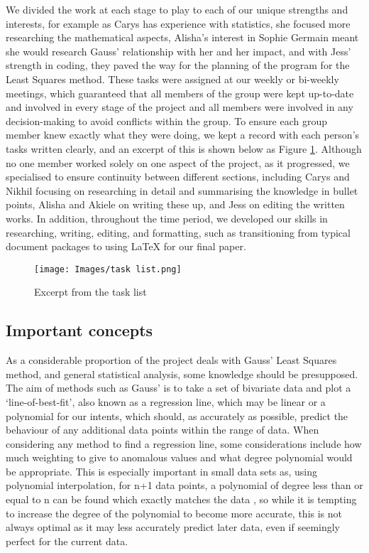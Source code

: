 \documentclass{article}
\begin{document}
We divided the work at each stage to play to each of our unique strengths and interests, for example as Carys has experience with statistics, she focused more researching the mathematical aspects, Alisha’s interest in Sophie Germain meant she would research Gauss' relationship with her and her impact, and with Jess’ strength in coding, they paved the way for the planning of the program for the Least Squares method. These tasks were assigned at our weekly or bi-weekly meetings, which guaranteed that all members of the group were kept up-to-date and involved in every stage of the project and all members were involved in any decision-making to avoid conflicts within the group. To ensure each group member knew exactly what they were doing, we kept a record with each person's tasks written clearly, and an excerpt of this is shown below as Figure \ref{tasklist}. Although no one member worked solely on one aspect of the project, as it progressed, we specialised to ensure continuity between different sections, including Carys and Nikhil focusing on researching in detail and summarising the knowledge in bullet points, Alisha and Akiele on writing these up, and Jess on editing the written works. In addition, throughout the time period, we developed our skills in researching, writing, editing, and formatting, such as transitioning from typical document packages to using LaTeX for our final paper.
\begin{figure}[H]
\centering
    \texttt{[image: Images/task list.png]} 
    \caption{Excerpt from the task list }
    \label{tasklist}
\end{figure}

\subsection{Important concepts}

As a considerable proportion of the project deals with Gauss’ Least Squares method, and general statistical analysis, some knowledge should be presupposed. The aim of methods such as Gauss’ is to take a set of bivariate data and plot a ‘line-of-best-fit', also known as a regression line, which may be linear or a polynomial for our intents, which should, as accurately as possible, predict the behaviour of any additional data points within the range of data. When considering any method to find a regression line, some considerations include how much weighting to give to anomalous values and what degree polynomial would be appropriate. This is especially important in small data sets as, using polynomial interpolation, for n+1 data points, a polynomial of degree less than or equal to n can be found which exactly matches the data \cite{meijering}, so while it is tempting to increase the degree of the polynomial to become more accurate, this is not always optimal as it may less accurately predict later data, even if seemingly perfect for the current data.
\end{document}
